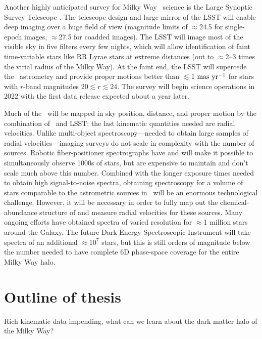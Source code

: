 Another highly anticipated survey for Milky Way \mwhalo\ science is the Large
Synoptic Survey Telescope \citep[LSST;][]{lsstsciencebook}. The telescope design
and large mirror of the LSST will enable deep imaging over a huge field of view
(magnitude limits of $\approx$24.5 for single-epoch images, $\approx$27.5 for
coadded images). The LSST will image most of the visible sky in five filters
every few nights, which will allow identification of faint time-variable stars
like RR Lyrae stars at extreme distances (out to $\approx$2--3 times the virial
radius of the Milky Way). At the faint end, the LSST will supercede the \gaia\
astrometry and provide proper motions better than $\lesssim$$1~{\rm mas}~{\rm
yr}^{-1}$ for stars with $r$-band magnitudes $20 \lesssim r \lesssim 24$. The
survey will begin science operations in 2022 with the first data release
expected about a year later.

Much of the \mwhalo\ will be mapped in sky position, distance, and proper motion
by the combination of \gaia\ and LSST; the last kinematic quantities needed are
radial velocities. Unlike multi-object spectroscopy---needed to obtain large
samples of radial velocities---imaging surveys do not scale in complexity with
the number of sources. Robotic fiber-positioner spectrographs
\citep{saunders12} have and will make it possible to simultaneously observe
1000s of stars, but are expensive to maintain and don't scale much above this
number. Combined with the longer exposure times needed to obtain high
signal-to-noise spectra, obtaining spectroscopy for a volume of stars comparable
to the astrometric sources in \gaia\ will be an enormous technological
challenge. However, it will be necessary in order to fully map out the
chemical-abundance structure of and measure radial velocities for these sources.
Many ongoing efforts \citep[e.g.,][]{rave06, segue08, apogee15, galah15} have
obtained spectra of varied resolution for $\approx$1 million stars around the
Galaxy. The future Dark Energy Spectroscopic Instrument
\citep[DESI;][]{desi-whitepaper} will take spectra of an additional
$\approx$$10^7$ stars, but this is still orders of magnitude below the number
needed to have complete 6D phase-space coverage for the entire Milky Way halo.


\section{Outline of thesis}

Rich kinematic data impending, what can we learn about the dark matter halo of the Milky Way?

